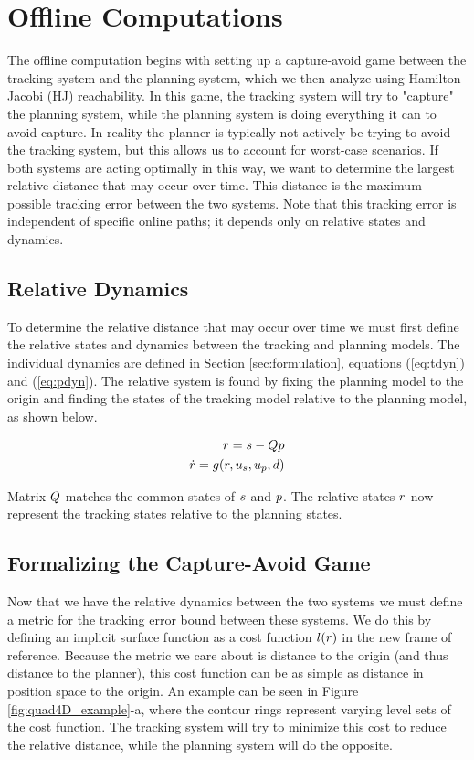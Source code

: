 \section{Offline Computations \label{sec:precomp}}
The offline computation begins with setting up a capture-avoid game between the tracking system and the planning system, which we then analyze using Hamilton Jacobi (HJ) reachability. In this game, the tracking system will try to "capture" the planning system, while the planning system is doing everything it can to avoid capture. In reality the planner is typically not actively be trying to avoid the tracking system, but this allows us to account for worst-case scenarios. If both systems are acting optimally in this way, we want to determine the largest relative distance that may occur over time. This distance is the maximum possible tracking error between the two systems. Note that this tracking error is independent of specific online paths; it depends only on relative states and dynamics.

\subsection{Relative Dynamics}
To determine the relative distance that may occur over time we must first define the relative states and dynamics between the tracking and planning models. The individual dynamics are defined in Section \ref{sec:formulation}, equations (\ref{eq:tdyn}) and (\ref{eq:pdyn}). The relative system is found by fixing the planning model to the origin and finding the states of the tracking model relative to the planning model, as shown below.

\begin{equation}
\label{eq:rdyn}
\begin{aligned}
r = s - Qp\\
\dot{r} = g(r, u_s, u_p, d)
\end{aligned}
\end{equation}

Matrix $Q$ matches the common states of $s$ and $p$. The relative states $r$ now represent the tracking states relative to the planning states.

\subsection{Formalizing the Capture-Avoid Game}
Now that we have the relative dynamics between the two systems we must define a metric for the tracking error bound between these systems. We do this by defining an implicit surface function as a cost function $l(r)$ in the new frame of reference. Because the metric we care about is distance to the origin (and thus distance to the planner), this cost function can be as simple as distance in position space to the origin. An example can be seen in Figure \ref{fig:quad4D_example}-a, where the contour rings represent varying level sets of the cost function. The tracking system will try to minimize this cost to reduce the relative distance, while the planning system will do the opposite.

